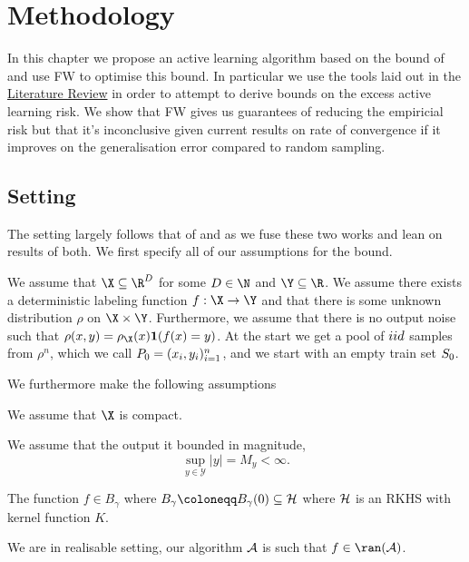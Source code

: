 \chapter{Methodology}
\label{ch:methodology}
In this chapter we propose an active learning algorithm based on the bound of
\cite{viering17_nuclear_discr_activ_learn} and use FW to optimise this bound. In
particular we use the tools laid out in the \hyperref[ch:lit-review]{Literature
  Review} in order to attempt to derive bounds on the excess active learning
risk. We show that FW gives us guarantees of reducing the empiricial risk but
that it's inconclusive given current results on rate of convergence if it
improves on the generalisation error compared to random sampling.

\section{Setting}
The setting largely follows that of \cite{viering17_nuclear_discr_activ_learn} and
\cite{beck04_condit_gradien_method_with_linear} as we fuse these two works and
lean on results of both. We first specify all of our assumptions for the bound.

\begin{assumption}
  \label{as:al-fw}
  We assume that \(\X \subseteq \R^{D}\) for some \(D \in \N\) and \(\Y \subseteq
  \R\). We assume there exists a deterministic labeling function \(f : \X \to
  \Y\) and that there is some unknown distribution \(\rho\) on \(\X \times \Y\).
  Furthermore, we assume that there is no output noise such that \(\rho(x, y) = \rho_{\X}(x)\mathbf{1}(f(x) =
  y)\). At the start we get a pool of \(iid\) samples from \(\rho^{n}\), which we
  call \(P_{0} = (x_{i}, y_{i})_{i=1}^{n}\), and we start with an empty train
  set \(S_{0}\).
\end{assumption}
We furthermore make the following assumptions
\begin{assumption}
  \label{as:domain-is-compact}
  We assume that \(\X\) is compact.
\end{assumption}
\begin{assumption}
  We assume that the output it bounded in magnitude,
  \label{as:output-bounded}
  \begin{equation*}
    \sup_{y \in \mathcal{Y}}|y| = M_y < \infty.
  \end{equation*}
\end{assumption}
\begin{assumption}
  \label{as:f-in-gamma-ball}
  The function \(f \in B_{\gamma}\) where \(B_{\gamma} \coloneqq B_{\gamma}(0) \subseteq \rkhs{H}\) where \(\mathcal{H}\) is an RKHS with kernel function \(K\).
\end{assumption}
\begin{assumption}
  \label{as:realisable-setting}
  We are in realisable setting, our algorithm \(\mathcal{A}\) is such that \(f \in \ran(\algo)\).
\end{assumption}

